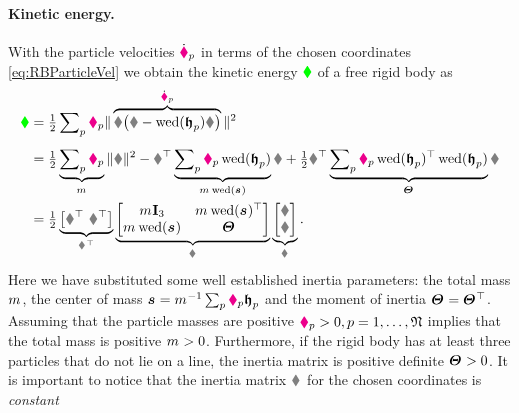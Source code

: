 \paragraph{Kinetic energy.}
With the particle velocities $\dot{\boldsymbol{\textcolor{magenta}{\blacklozenge}}}_{p}$ in terms of the chosen coordinates \eqref{eq:RBParticleVel} we obtain the kinetic energy $\textcolor{green}{\blacklozenge}$ of a free rigid body as 
\begin{align}\label{eq:RigidBodyKineticEnergy}
 \kineticEnergy &= \tfrac{1}{2} \sumParticles \particleMass{\PidxI} \norm{\overbrace{\R \big( \v - \wedOp(\particleBodyPos{\PidxI}) \w \big)}^{\particlePosd{\PidxI}}}^2
\nonumber\\[1ex]
 &= \tfrac{1}{2} \underbrace{\sumParticles \particleMass{\PidxI}}_{\bodyMass{}{}} \norm{\v}^2
  - \v^\top \underbrace{\sumParticles \particleMass{\PidxI} \wedOp(\particleBodyPos{\PidxI})}_{\bodyMass{}{} \wedOp(\bodyCOM{}{})} \w
  + \tfrac{1}{2} \w^\top \underbrace{\sumParticles \particleMass{\PidxI} \wedOp(\particleBodyPos{\PidxI})^\top \wedOp(\particleBodyPos{\PidxI})}_{\bodyMOI{}{}} \w
\nonumber\\
 &= \tfrac{1}{2} \underbrace{\big[ \v^\top \ \w^\top \big]}_{\bodyVel{}{}^\top}
 \underbrace{\begin{bmatrix} \bodyMass{}{}\idMat[3] & \bodyMass{}{} \wedOp(\bodyCOM{}{})^\top \\ \bodyMass{}{} \wedOp(\bodyCOM{}{}) & \bodyMOI{}{} \end{bmatrix}}_{\bodyInertiaMat{}{}}
 \underbrace{\begin{bmatrix} \v \\ \w \end{bmatrix}}_{\bodyVel{}{}}
 .
\end{align}
Here we have substituted some well established inertia parameters: the total mass $\bodyMass{}{}$, the center of mass $\bodyCOM{}{} = \bodyMass{}{}^{-1} \sumParticles \particleMass{\PidxI} \particleBodyPos{\PidxI}$ and the moment of inertia $\bodyMOI{}{} = \bodyMOI{}{}^\top$.
Assuming that the particle masses are positive $\textcolor{magenta}{\blacklozenge}_{p} > 0, p=1,\ldots,\mathfrak{N}$ implies that the total mass is positive $\bodyMass{}{} > 0$.
Furthermore, if the rigid body has at least three particles that do not lie on a line, the inertia matrix is positive definite $\bodyMOI{}{} > 0$.
It is important to notice that the inertia matrix $\bodyInertiaMat{}{}$ for the chosen coordinates is \textit{constant}%
